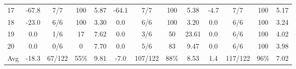 \begin{table}[p]
{\begin{tabular}{l|cccc|cccc|cccc}
17 & -67.8 & 7/7 & 100 & 5.87 & -64.1 & 7/7 & 100 & 5.38 & -4.7 & 7/7 & 100 & 5.17 \\
18 & -23.0 & 6/6 & 100 & 3.30 & 0.0 & 6/6 & 100 & 3.20 & 0.0 & 6/6 & 100 & 3.24 \\
19 & 0.0 & 1/6 & 17 & 7.62 & 0.0 & 3/6 & 50 & 23.61 & 0.0 & 6/6 & 100 & 4.02 \\
20 & 0.0 & 0/6 & 0 & 7.70 & 0.0 & 5/6 & 83 & 9.47 & 0.0 & 6/6 & 100 & 3.98 \\
\midrule
Avg & -18.3 & 67/122 & 55\% & 9.81 & -7.0 & 107/122 & 88\% & 8.53 & 1.4 & 117/122 & 96\% & 7.02 \\
\bottomrule
\end{tabular}%
}
\end{table}
